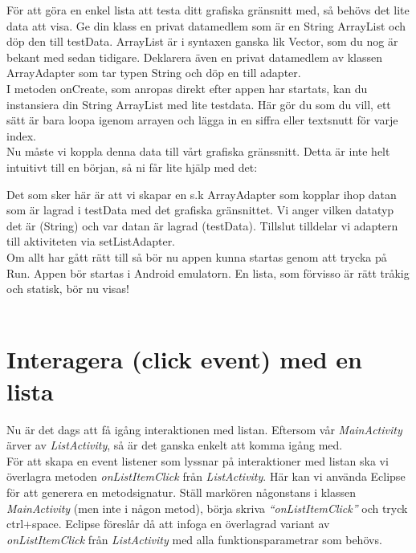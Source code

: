 \documentclass[11 pt]{article} %
\begin{document}
För att göra en enkel lista att testa ditt grafiska gränsnitt med, så behövs det lite data att visa.
Ge din klass en privat datamedlem som är en String ArrayList och döp den till testData. ArrayList är i syntaxen ganska lik Vector, som du nog är bekant med sedan tidigare.
Deklarera även en privat datamedlem av klassen ArrayAdapter som tar typen String och döp en till adapter.\\


I metoden onCreate, som anropas direkt efter appen har startats, kan du instansiera din String ArrayList med lite testdata. Här gör du som du vill, ett sätt är bara loopa igenom arrayen och lägga in en siffra eller textsnutt för varje index.\\

Nu måste vi koppla denna data till vårt grafiska gränssnitt. Detta är inte helt intuitivt till en början, så ni får lite hjälp med det:

Det som sker här är att vi skapar en s.k ArrayAdapter som kopplar ihop datan som är lagrad i testData med det grafiska gränsnittet. Vi anger vilken datatyp det är (String) och var datan är lagrad (testData). Tillslut tilldelar vi adaptern till aktiviteten via setListAdapter.\\

Om allt har gått rätt till så bör nu appen kunna startas genom att trycka på Run. Appen bör startas i Android emulatorn. En lista, som förvisso är rätt tråkig och statisk, bör nu visas!\\ \\


\section{Interagera (click event) med en lista}
Nu är det dags att få igång interaktionen med listan. Eftersom vår \textit{MainActivity} ärver av \textit{ListActivity}, så är det ganska enkelt att komma igång med.\\

För att skapa en event listener som lyssnar på interaktioner med listan ska vi överlagra metoden \textit{onListItemClick} från \textit{ListActivity}. Här kan vi använda Eclipse för att generera en metodsignatur. Ställ markören någonstans i klassen \textit{MainActivity} (men inte i någon metod), börja skriva \textit{“onListItemClick”} och tryck ctrl+space. Eclipse föreslår då att infoga en överlagrad variant av \textit{onListItemClick} från \textit{ListActivity} med alla funktionsparametrar som behövs.\\
\end{document}
